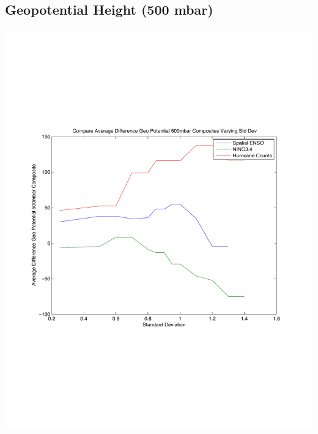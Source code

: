 \documentclass[11pt]{article}
\begin{document}
\subsection{Geopotential Height (500 mbar)}
\includegraphics[scale=0.6]{images/varyingStdDevForCompositesGeopotential500mbar.pdf}
\end{document}
